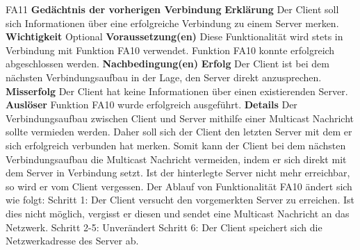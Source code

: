 \documentclass[a4paper,12pt]{article}
\begin{document}
\begin{itemize}[nosep]
\begin{minipage}[t]{\linewidth}
\item[FA11] \textbf{Gedächtnis der vorherigen Verbindung}
\subitem \textbf{Erklärung} Der \gls{Client} soll sich Informationen über eine erfolgreiche Verbindung zu einem \gls{Server} merken.
\subitem \textbf{Wichtigkeit} Optional
\subitem \textbf{Voraussetzung(en)} Diese Funktionalität wird stets in Verbindung mit Funktion FA10 verwendet.\newline
Funktion FA10 konnte erfolgreich abgeschlossen werden.
\subitem \textbf{Nachbedingung(en)}
\subsubitem \textbf{Erfolg} Der \gls{Client} ist bei dem nächsten Verbindungsaufbau in der Lage, den \gls{Server} direkt anzusprechen.
\subsubitem \textbf{Misserfolg} Der \gls{Client} hat keine Informationen über einen existierenden \gls{Server}.
\subitem \textbf{Auslöser} Funktion FA10 wurde erfolgreich ausgeführt.
\subitem \textbf{Details} Der Verbindungsaufbau zwischen \gls{Client} und \gls{Server} mithilfe einer \gls{Multicast} Nachricht sollte vermieden werden. Daher soll sich der \gls{Client} den letzten \gls{Server} mit dem er sich erfolgreich verbunden hat merken. Somit kann der \gls{Client} bei dem nächsten Verbindungsaufbau die \gls{Multicast} Nachricht vermeiden, indem er sich direkt mit dem \gls{Server} in Verbindung setzt.\newline
Ist der hinterlegte \gls{Server} nicht mehr erreichbar, so wird er vom \gls{Client} vergessen.\newline
Der Ablauf von Funktionalität FA10 ändert sich wie folgt:\newline
Schritt 1: Der \gls{Client} versucht den vorgemerkten \gls{Server} zu erreichen. Ist dies nicht möglich, vergisst er diesen und sendet eine \gls{Multicast} Nachricht an das Netzwerk.\newline
Schritt 2-5: Unverändert
Schritt 6: Der \gls{Client} speichert sich die Netzwerkadresse des \gls{Server} ab.
\end{minipage}
\pagebreak


\end{itemize}
\end{document}
